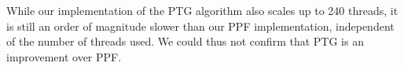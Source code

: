 \documentclass[letterpaper]{article}
\newcommand{\mypar}[1]{{\bf #1.}}
\begin{document}
While our implementation of the PTG algorithm also scales up to 240 threads, it is still an order of magnitude slower than our PPF implementation, independent of the number of threads used. We could thus not confirm that PTG is an improvement over PPF.

%
%
%
%
%
%
%
%
%
%
%
%
%
%
%
%
\end{document}
